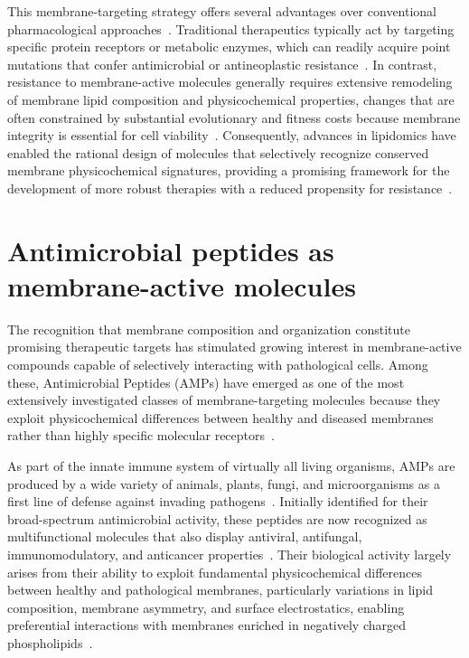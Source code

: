 This membrane-targeting strategy offers several advantages over conventional pharmacological approaches~\cite{membrane_therapy}. Traditional therapeutics typically act by targeting specific protein receptors or metabolic enzymes, which can readily acquire point mutations that confer antimicrobial or antineoplastic resistance~\cite{holohan2013cancer}. In contrast, resistance to membrane-active molecules generally requires extensive remodeling of membrane lipid composition and physicochemical properties, changes that are often constrained by substantial evolutionary and fitness costs because membrane integrity is essential for cell viability~\cite{macdermott2022lipid}. Consequently, advances in lipidomics have enabled the rational design of molecules that selectively recognize conserved membrane physicochemical signatures, providing a promising framework for the development of more robust therapies with a reduced propensity for resistance~\cite{lipidomics_4,lipidomics_2}.






\section{Antimicrobial peptides as membrane-active molecules}

The recognition that membrane composition and organization constitute promising therapeutic targets has stimulated growing interest in membrane-active compounds capable of selectively interacting with pathological cells. Among these, Antimicrobial Peptides (AMPs) have emerged as one of the most extensively investigated classes of membrane-targeting molecules because they exploit physicochemical differences between healthy and diseased membranes rather than highly specific molecular receptors~\cite{WEISBERG2026102781}.

As part of the innate immune system of virtually all living organisms, AMPs are produced by a wide variety of animals, plants, fungi, and microorganisms as a first line of defense against invading pathogens~\cite{Zasloff2002}. Initially identified for their broad-spectrum antimicrobial activity, these peptides are now recognized as multifunctional molecules that also display antiviral, antifungal, immunomodulatory, and anticancer properties~\cite{Midura-Nowaczek2014}. Their biological activity largely arises from their ability to exploit fundamental physicochemical differences between healthy and pathological membranes, particularly variations in lipid composition, membrane asymmetry, and surface electrostatics, enabling preferential interactions with membranes enriched in negatively charged phospholipids~\cite{Midura-Nowaczek2014}.

